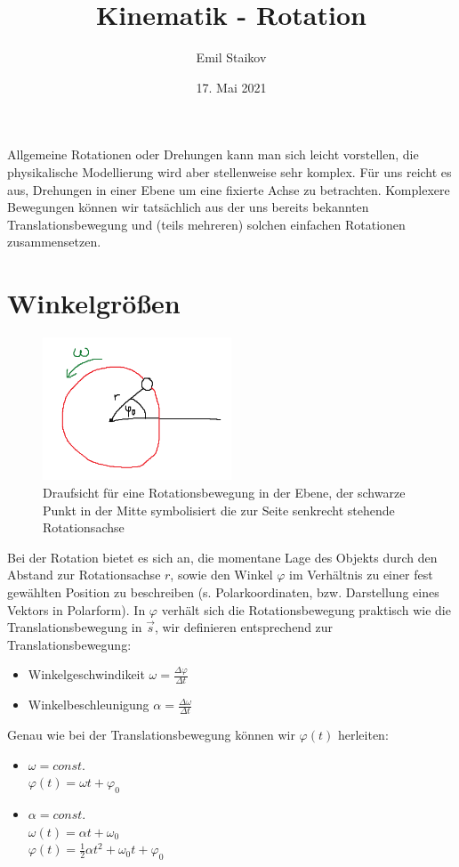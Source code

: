 \documentclass[11pt]{article}
\title{Kinematik - Rotation}
\author{Emil Staikov}
\date{17. Mai 2021}
\begin{document}
\maketitle
Allgemeine Rotationen oder Drehungen kann man sich leicht vorstellen, die physikalische Modellierung wird aber stellenweise sehr komplex. Für uns reicht es aus, Drehungen in einer Ebene um eine fixierte Achse zu betrachten. Komplexere Bewegungen können wir tatsächlich aus der uns bereits bekannten Translationsbewegung und (teils mehreren) solchen einfachen Rotationen zusammensetzen. 

\section{Winkelgrößen}
\begin{figure}[H]
        \centering
        \includegraphics[width=0.5\textwidth]{rotation.png}
        \caption{Draufsicht für eine Rotationsbewegung in der Ebene, der schwarze Punkt in der Mitte symbolisiert die zur Seite senkrecht stehende Rotationsachse}
\end{figure}
Bei der Rotation bietet es sich an, die momentane Lage des Objekts durch den Abstand zur Rotationsachse $r$, sowie den Winkel $\varphi$ im Verhältnis zu einer fest gewählten Position zu beschreiben (s. Polarkoordinaten, bzw. Darstellung eines Vektors in Polarform). In $\varphi$ verhält sich die Rotationsbewegung praktisch wie die Translationsbewegung in $\vec{s}$, wir definieren entsprechend zur Translationsbewegung: 
\begin{itemize}
        \item Winkelgeschwindikeit $\displaystyle\omega = \frac{\Delta \varphi}{\Delta t}$
        \item Winkelbeschleunigung $\displaystyle\alpha = \frac{\Delta \omega}{\Delta t}$
\end{itemize}
Genau wie bei der Translationsbewegung können wir $\varphi(t)$ herleiten: 
\begin{itemize}
        \item $\omega = const.$ \\
                $\varphi(t) = \omega t + \varphi_0$
        \item $\alpha = const.$ \\
                $\omega(t) = \alpha t + \omega_0$ \\
                $\varphi(t) = \frac{1}{2}\alpha t^2 + \omega_0 t + \varphi_0$ 
\end{itemize}
\end{document}

